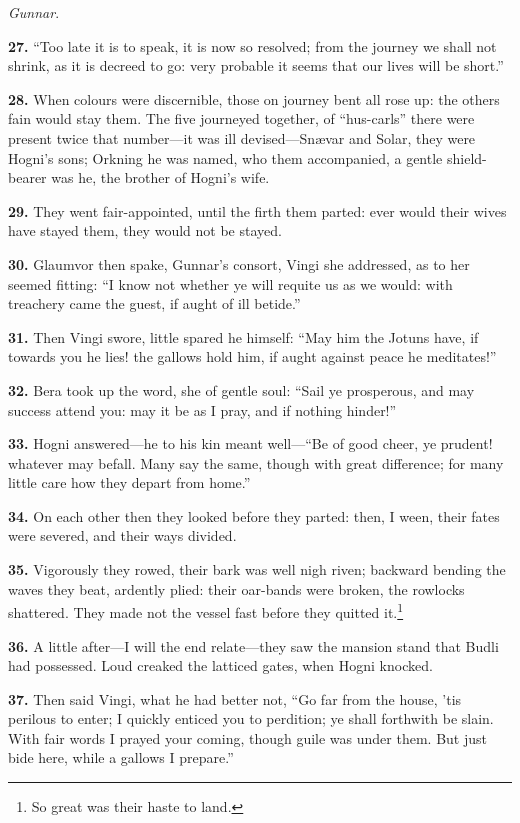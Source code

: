 \emph{Gunnar}.

\textbf{27.} ``Too late it is to speak, it is now so resolved; from the
journey we shall not shrink, as it is decreed to go: very probable it
seems that our lives will be short.''

\textbf{28.} When colours were discernible, those on journey bent all rose
up: the others fain would stay them. The five journeyed together, of
``hus-carls'' there were present twice that number—it was ill
devised—Snævar and Solar, they were Hogni's sons; Orkning he was
named, who them accompanied, a gentle shield-bearer was he, the
brother of Hogni's wife.

\textbf{29.} They went fair-appointed, until the firth them parted: ever
would their wives have stayed them, they would not be stayed.

\textbf{30.} Glaumvor then spake, Gunnar's consort, Vingi she addressed, as
to her seemed fitting: ``I know not whether ye will requite us as we
would: with treachery came the guest, if aught of ill betide.''

\textbf{31.} Then Vingi swore, little spared he himself: ``May him the Jotuns
have, if towards you he lies! the gallows hold him, if aught against
peace he meditates!''

\textbf{32.} Bera took up the word, she of gentle soul: ``Sail ye prosperous,
and may success attend you: may it be as I pray, and if nothing
hinder!''

\textbf{33.} Hogni answered—he to his kin meant well—``Be of good cheer, ye
prudent! whatever may befall. Many say the same, though with great
difference; for many little care how they depart from home.''

\textbf{34.} On each other then they looked before they parted: then, I ween,
their fates were severed, and their ways divided.

\textbf{35.} Vigorously they rowed, their bark was well nigh riven; backward
bending the waves they beat, ardently plied: their oar-bands were
broken, the rowlocks shattered. They made not the vessel fast before
they quitted it.\footnote{So great was their haste to land.}

\textbf{36.} A little after—I will the end relate—they saw the mansion
stand that Budli had possessed. Loud creaked the latticed gates, when
Hogni knocked.

\textbf{37.} Then said Vingi, what he had better not, ``Go far from the house,
'tis perilous to enter; I quickly enticed you to perdition; ye shall
forthwith be slain. With fair words I prayed your coming, though guile
was under them. But just bide here, while a gallows I prepare.''

